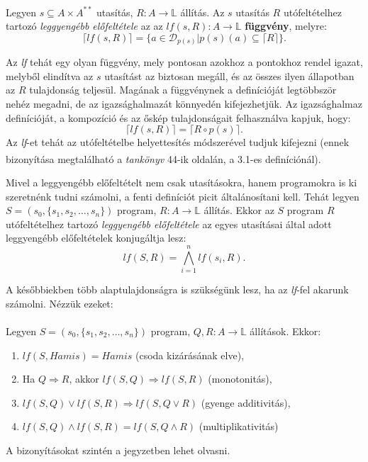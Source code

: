 \documentclass[12pt]{article}
\newcommand{\sut}{\ensuremath{s \subseteq A \times A^{**}} }
\newcommand{\sprog}{\ensuremath{S = (s_0, \{s_1, s_2, \dots, s_n\})} }
\begin{document}
	\paragraph{}
	Legyen \sut utasítás, $R: A \rightarrow \mathbb{L}$ állítás. Az $s$ utasítás $R$ utófeltételhez tartozó \textit{leggyengébb előfeltétele} az az $lf(s,R): A \rightarrow \mathbb{L}$ \textbf{függvény}, melyre:
	$$ \lceil lf(s,R) \rceil = \{ a \in \mathcal{D}_{p(s)} | p(s)(a) \subseteq \lceil R \rceil \}. $$
	\par Az \textit{lf} tehát egy olyan függvény, mely pontosan azokhoz a pontokhoz rendel igazat, melyből elindítva az $s$ utasítást az biztosan megáll, és az összes ilyen állapotban az $R$ tulajdonság teljesül.
	Magának a függvénynek a definícióját legtöbbször nehéz megadni, de az igazsághalmazát könnyedén kifejezhetjük. Az igazsághalmaz definícióját, a kompozíció és az őskép tulajdonságait felhasználva kapjuk, hogy:
	$$\lceil lf(s,R)\rceil = \lceil R \circ p(s) \rceil.$$
	Az \textit{lf}-et tehát az utófeltételbe helyettesítés módszerével tudjuk kifejezni (ennek bizonyítása megtalálható a \textit{tankönyv}\textsuperscript{\cite{fothi_biblia}} 44-ik oldalán, a 3.1-es definíciónál). 
	
	\par Mivel a leggyengébb előfeltételt nem csak utasításokra, hanem programokra is ki szeretnénk tudni számolni, a fenti definíciót picit általánosítani kell. Tehát legyen \sprog program, $R: A \rightarrow \mathbb{L}$ állítás. Ekkor az $S$ program $R$ utófeltételhez tartozó \textit{leggyengébb előfeltétele} az egyes utasításai által adott leggyengébb előfeltételek konjugáltja lesz:
	$$ lf(S, R) = \bigwedge_{i=1}^n lf(s_i, R). $$
	
	
	A későbbiekben több alaptulajdonságra is szükségünk lesz, ha az \textit{lf}-fel akarunk számolni. Nézzük ezeket:
	\paragraph{}
	Legyen \sprog program, $Q,R: A \rightarrow \mathbb{L}$ állítások. Ekkor:
	\begin{enumerate}
		\item $lf(S, Hamis) = Hamis$ (csoda kizárásának elve),
		\item Ha $Q \Rightarrow R$, akkor $lf(S,Q) \Rightarrow lf(S,R)$ (monotonitás),
		\item $lf(S,Q) \lor lf(S,R) \Rightarrow lf(S, Q\lor R)$ (gyenge additivitás),
		\item $lf(S,Q) \land lf(S,R) = lf(S, Q\land R)$ (multiplikativitás)
	\end{enumerate}
	A bizonyításokat szintén a jegyzetben lehet olvasni.
	
\end{document}
